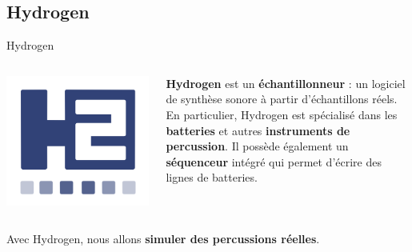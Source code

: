 \documentclass{beamer}
\begin{document}
\subsection{Hydrogen}
\begin{frame}{Hydrogen}
  \begin{columns}
  \begin{column}{0.15\textwidth}
    \includegraphics[width=\linewidth]{hydrogen_logo}
  \end{column}
  \begin{column}{0.85\textwidth}
    \textbf{Hydrogen} est un \textbf{échantillonneur} : un logiciel de synthèse sonore à partir d'échantillons réels. En particulier, Hydrogen est spécialisé dans les \textbf{batteries} et autres \textbf{instruments de percussion}. Il possède également un \textbf{séquenceur} intégré qui permet d'écrire des lignes de batteries.
  \end{column}
  \end{columns}
  \medskip
    
  Avec Hydrogen, nous allons \textbf{simuler des percussions réelles}.
\end{frame}
\end{document}
